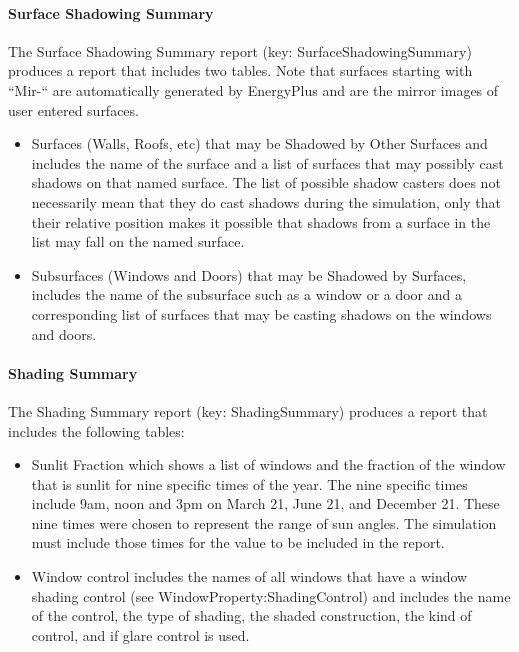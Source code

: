 \paragraph{Surface Shadowing Summary}\label{surface-shadowing-summary}

The Surface Shadowing Summary report (key: SurfaceShadowingSummary) produces a report that includes two tables. Note that surfaces starting with ``Mir-`` are automatically generated by EnergyPlus and are the mirror images of user entered surfaces.

\begin{itemize}
\item
  Surfaces (Walls, Roofs, etc) that may be Shadowed by Other Surfaces and includes the name of the surface and a list of surfaces that may possibly cast shadows on that named surface. The list of possible shadow casters does not necessarily mean that they do cast shadows during the simulation, only that their relative position makes it possible that shadows from a surface in the list may fall on the named surface.
\item
  Subsurfaces (Windows and Doors) that may be Shadowed by Surfaces, includes the name of the subsurface such as a window or a door and a corresponding list of surfaces that may be casting shadows on the windows and doors.
\end{itemize}

\paragraph{Shading Summary}\label{shading-summary}

The Shading Summary report (key: ShadingSummary) produces a report that includes the following tables:

\begin{itemize}
\item
  Sunlit Fraction which shows a list of windows and the fraction of the window that is sunlit for nine specific times of the year. The nine specific times include 9am, noon and 3pm on March 21, June 21, and December 21. These nine times were chosen to represent the range of sun angles. The simulation must include those times for the value to be included in the report.
\item
  Window control includes the names of all windows that have a window shading control (see WindowProperty:ShadingControl) and includes the name of the control, the type of shading, the shaded construction, the kind of control, and if glare control is used.
\end{itemize}

